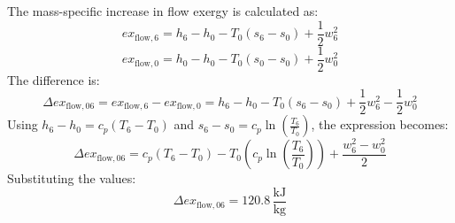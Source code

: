 The mass-specific increase in flow exergy is calculated as:  
\[
ex_{\text{flow},6} = h_6 - h_0 - T_0 (s_6 - s_0) + \frac{1}{2} w_6^2
\]  
\[
ex_{\text{flow},0} = h_0 - h_0 - T_0 (s_0 - s_0) + \frac{1}{2} w_0^2
\]  
The difference is:  
\[
\Delta ex_{\text{flow},06} = ex_{\text{flow},6} - ex_{\text{flow},0} = h_6 - h_0 - T_0 (s_6 - s_0) + \frac{1}{2} w_6^2 - \frac{1}{2} w_0^2
\]  
Using \( h_6 - h_0 = c_p (T_6 - T_0) \) and \( s_6 - s_0 = c_p \ln \left( \frac{T_6}{T_0} \right) \), the expression becomes:  
\[
\Delta ex_{\text{flow},06} = c_p (T_6 - T_0) - T_0 \left( c_p \ln \left( \frac{T_6}{T_0} \right) \right) + \frac{w_6^2 - w_0^2}{2}
\]  
Substituting the values:  
\[
\Delta ex_{\text{flow},06} = 120.8 \, \frac{\text{kJ}}{\text{kg}}
\]